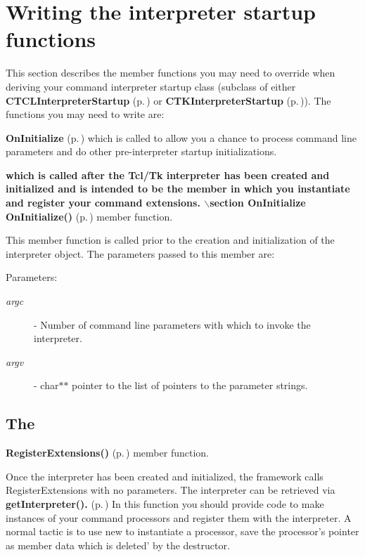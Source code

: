 \section{Writing the interpreter startup functions}\label{TclInterpreters}


This section describes the member functions you may need to override when  deriving your command interpreter startup class (subclass of either {\bf CTCLInterpreter\-Startup} {\rm (p.\,\pageref{classCTCLInterpreterStartup})} or {\bf CTKInterpreter\-Startup} {\rm (p.\,\pageref{classCTKInterpreterStartup})}). The functions you may need to write are:\begin{CompactItemize}
\item 
{\bf On\-Initialize} {\rm (p.\,\pageref{classCInterpreterStartup_b0})} which is called to allow you a chance to process command line parameters and do other pre-interpreter startup initializations.\item 
{\bf which is called after the   Tcl/Tk interpreter has been created and initialized and is intended to be   the member in which you instantiate and register your command extensions.  $\backslash$section On\-Initialize  	On\-Initialize()} {\rm (p.\,\pageref{classCInterpreterStartup_b1})} member function.\end{CompactItemize}
This member function is called prior to the creation and initialization of the interpreter object. The parameters passed to this member are: \begin{Desc}
\item[Parameters: ]\par
\begin{description}
\item[{\em 
argc}]- Number of command line parameters with which to invoke the interpreter. \item[{\em 
argv}]- char$\ast$$\ast$ pointer to the list of pointers to the parameter strings.\end{description}
\end{Desc}
\subsection{The}\label{RegisterExtensions}
 {\bf Register\-Extensions()} {\rm (p.\,\pageref{classCInterpreterStartup_b1})} member function.

Once the interpreter has been created and initialized, the framework calls Register\-Extensions with no parameters. The interpreter can be retrieved via {\bf get\-Interpreter().} {\rm (p.\,\pageref{classCInterpreterStartup_a2})} In this function you should provide code to make instances of your command processors and register them with the interpreter. A normal tactic is to use new to  instantiate a processor, save the processor's pointer as member data which is deleted' by the destructor.


